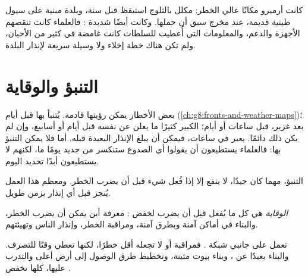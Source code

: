 كانت أرميرو مكانًا عالي الخطر:  مكلل بالثلوج استيقظ قبل سنة، وبلدة مبنية على
 سيول طينية قديمة، عند مخرج  سبق أن حملها. وكانت أيضًا شديدة :
فالعلماء كانت تنقصهم الأجهزة والدعم، والمعلومات التي أُعطيت للسلطات كانت غامضة في
كثير من الأحيان، ولم تكن هناك خطة إخلاء ولا وسيلة سريعة لإنذار
البلدة.

\section{التنبؤ والوقاية}

بعض الأخطار يمكن رؤيتها قادمة.  يُتنبأ بها قبل أيام
(\cref{ch:g8:fronts-and-weather-maps})؛  بعد  غزير، قبل ساعات أو أيام؛
 الكبير كثيرًا ما يعلن عن نفسه قبل أيام أو أسابيع، وإن لم يكن ذلك دائمًا.
 يعبر  في ساعات، فيمكن أن يبلغ الإنذار  البعيدة قبله. أما
 فلا يمكن التنبؤ بها: فالعلماء يستطيعون أن يقولوا أي الصدوع ستنكسر من جديد
يومًا ما، لكنهم لا يستطيعون أبدًا تحديد اليوم.

التنبؤ، مهما كان جيدًا، لا ينفع إلا إذا فُعل شيء قبل أن يضرب الخطر. ومعظم هذا العمل
يُنجز قبل أي إنذار بزمن طويل.

\begin{definition}[الوقاية]\label{def:g9:natural-risks:prevention}
\emph{الوقاية} هي كل ما يُفعل قبل أن يضرب  لخفض :
معرفة أين يمكن أن يضرب الخطر، والبناء في أماكن آمنة وبطرق آمنة، ومراقبة الخطر،
وإنذار الناس وتهيئتهم.
\end{definition}

تعمل  على جانبي شبكة . فمراقبة  أو  لا تجعله أقل خطرًا، لكنها
تعطي وقتًا للتصرف. والبناء بعيدًا عن ، وبناء بيوت متينة، وتخطيط طرق
الوصول إلى أرض أعلى والتدرب عليها، كلها تخفض .

